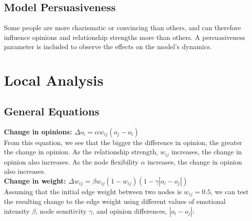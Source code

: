 \documentclass[11pt]{article}
\begin{document}
\subsection{Model Persuasiveness}

Some people are more charismatic or convincing than others, and can
therefore influence opinions and relationship strengths more than
others. A persuasiveness parameter is included to observe the effects on
the model's dynamics.
\newpage
\section{Local Analysis}

\subsection{General Equations}

\textbf{Change in opinions: \(\Delta o_i = \alpha w_{ij}(o_j - o_i)\)}\\

From this equation, we see that the bigger the difference in opinion,
the greater the change in opinion. As the relationship strength,
\(w_{ij}\) increases, the change in opinion also increases. As the node
flexibility \(\alpha\) increases, the change in opinion also increases.\\

\textbf{Change in weight:
\(\Delta w_{ij} = \beta w_{ij}(1-w_{ij})(1-\gamma |o_i-o_j|)\)}\\

Assuming that the initial edge weight between two nodes is
\(w_{ij}=0.5\), we can test the resulting change to the edge weight
using different values of emotional intensity \(\beta\), node
sensitivity \(\gamma\), and opinion differences, \(|o_i - o_j|\):
\end{document}
